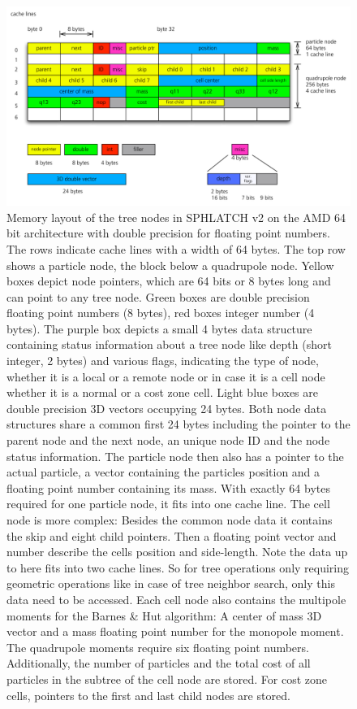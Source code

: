 \begin{figure}[htbp]
\begin{center}
\includegraphics[scale=0.6]{28algo_cells.pdf}
\caption{Memory layout of the tree nodes in SPHLATCH v2 on the AMD 64 bit architecture with double precision for floating point numbers. The rows indicate cache lines with a width of 64 bytes. The top row shows a particle node, the block below a quadrupole node. Yellow boxes depict node pointers, which are 64 bits or 8 bytes long and can point to any tree node. Green boxes are double precision floating point numbers (8 bytes), red boxes integer number (4 bytes). The purple box depicts a small 4 bytes data structure containing status information about a tree node like depth (short integer, 2 bytes) and various flags, indicating the type of node, whether it is a local or a remote node or in case it is a cell node whether it is a normal or a cost zone cell. Light blue boxes are double precision 3D vectors occupying 24 bytes. Both node data structures share a common first 24 bytes including the pointer to the parent node and the next node, an unique node ID and the node status information.
The particle node then also has a pointer to the actual particle, a vector containing the particles position and a floating point number containing its mass. With exactly 64 bytes required for one particle node, it fits into one cache line.
The cell node is more complex: Besides the common node data it contains the skip and eight child pointers. Then a floating point vector and number describe the cells position and side-length. Note the data up to here fits into two cache lines. So for tree operations only requiring geometric operations like in case of tree neighbor search, only this data need to be accessed. Each cell node also contains the multipole moments for the Barnes \& Hut algorithm: A center of mass 3D vector and a mass floating point number for the monopole moment. The quadrupole moments require six floating point numbers. Additionally, the number of particles and the total cost of all particles in the subtree of the cell node are stored. For cost zone cells, pointers to the first and last child nodes are stored.}
\label{ch02_fig28}
\end{center}
\end{figure}

